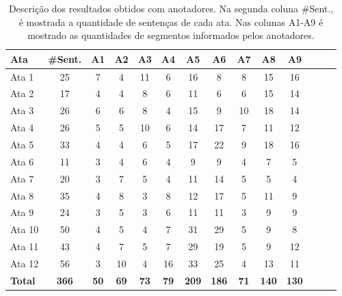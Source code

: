 \begin{table}[!h]
	\centering
	\begin{tabular}{|l|c|c|c|c|c|c|c|c|c|c|c|c|c|} \hline
		\textbf{Ata} & \textbf{\#Sent.}  & 
		\textbf{A1}  & 
		\textbf{A2}  & 
		\textbf{A3}  & 
		\textbf{A4}  & 
		\textbf{A5}  & 
		\textbf{A6}  & 
		\textbf{A7}  & 
		\textbf{A8}  & 
		\textbf{A9} 
		\\	\hline
		Ata 1  & 25 & 7  & 4  & 11 & 6  & 16 & 8  & 8  & 15 & 16 \\ \hline 
		Ata 2  & 17 & 4  & 4  & 8  & 6  & 11 & 6  & 6  & 15 & 14 \\ \hline 
		Ata 3  & 26 & 6  & 6  & 8  & 4  & 15 & 9  & 10 & 18 & 14 \\ \hline 
		Ata 4  & 26 & 5  & 5  & 10 & 6  & 14 & 17 & 7  & 11 & 12 \\ \hline 
		Ata 5  & 33 & 4  & 4  & 6  & 5  & 17 & 22 & 9  & 18 & 16 \\ \hline 
		Ata 6  & 11 & 3  & 4  & 6  & 4  & 9  & 9  & 4  & 7  &  5 \\ \hline 
		Ata 7  & 20 & 3  & 7  & 5  & 4  & 11 & 14 & 5  & 5  &  4 \\ \hline 
		Ata 8  & 35 & 4  & 8  & 3  & 8  & 12 & 17 & 5  & 11 &  9 \\ \hline 
		Ata 9  & 24 & 3  & 5  & 3  & 6  & 11 & 11 & 3  & 9  &  9 \\ \hline 
		Ata 10 & 50 & 4  & 5  & 4  & 7  & 31 & 29 & 5  & 9  &  8 \\ \hline 
		Ata 11 & 43 & 4  & 7  & 5  & 7  & 29 & 19 & 5  & 9  & 12 \\ \hline 
		Ata 12 & 56 & 3  & 10 & 4  & 16 & 33 & 25 & 4  & 13 & 11 \\ \hline 
		\textbf{Total} &
		\textbf{366} & 
		\textbf{50}&  
		\textbf{69} & 
		\textbf{73}&  
		\textbf{79}&  
		\textbf{209} & 
		\textbf{186}&  
		\textbf{71}&  
		\textbf{140}&  
		\textbf{130} 
		\\ \hline 

	\end{tabular}
	\caption{Descrição dos resultados obtidos com anotadores. Na segunda coluna \#Sent., é mostrada a quantidade de sentenças de cada ata. Nas colunas A1-A9 é mostrado as quantidades de segmentos informados pelos anotadores. 
} 

	\label{tab:ataseanotacoes}
\end{table}





